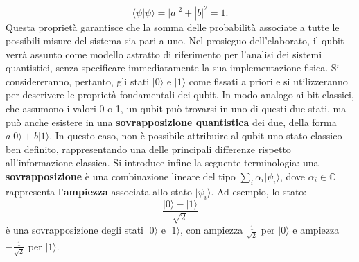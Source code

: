 \documentclass[a4paper,12pt]{report}
\theoremstyle{plain}
\begin{document}
\[
\langle \psi | \psi \rangle = |a|^2 + |b|^2 = 1.
\]
Questa proprietà garantisce che la somma delle probabilità associate a tutte le possibili misure del sistema sia pari a uno.
Nel prosieguo dell'elaborato, il qubit verrà assunto come modello astratto di riferimento per l'analisi dei sistemi quantistici, senza specificare immediatamente la sua implementazione fisica. Si considereranno, pertanto, gli stati \(|0\rangle\) e \(|1\rangle\) come fissati a priori e si utilizzeranno per descrivere le proprietà fondamentali dei qubit. In modo analogo ai bit classici, che assumono i valori 0 o 1, un qubit può trovarsi in uno di questi due stati, ma può anche esistere in una \textbf{sovrapposizione quantistica} dei due, della forma \(a|0\rangle + b|1\rangle\). In questo caso, non è possibile attribuire al qubit uno stato classico ben definito, rappresentando una delle principali differenze rispetto all'informazione classica.
Si introduce infine la seguente terminologia: una \textbf{sovrapposizione} è una combinazione lineare del tipo \(\sum_i \alpha_i |\psi_i\rangle\), dove \(\alpha_i \in \mathbb{C}\) rappresenta l'\textbf{ampiezza} associata allo stato \(|\psi_i\rangle\). Ad esempio, lo stato:
\[
\frac{|0\rangle - |1\rangle}{\sqrt{2}}
\]
è una sovrapposizione degli stati \(|0\rangle\) e \(|1\rangle\), con ampiezza \(\frac{1}{\sqrt{2}}\) per \(|0\rangle\) e ampiezza \(-\frac{1}{\sqrt{2}}\) per \(|1\rangle\).
\end{document}
